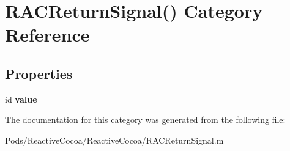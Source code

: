\hypertarget{category_r_a_c_return_signal_07_08}{}\section{R\+A\+C\+Return\+Signal() Category Reference}
\label{category_r_a_c_return_signal_07_08}
\subsection*{Properties}
\begin{DoxyCompactItemize}
\item 
\mbox{\label{category_r_a_c_return_signal_07_08_aa808511a21ebe3060fbdf40b58b436ac}} 
id {\bfseries value}
\end{DoxyCompactItemize}


The documentation for this category was generated from the following file\+:\begin{DoxyCompactItemize}
\item 
Pods/\+Reactive\+Cocoa/\+Reactive\+Cocoa/R\+A\+C\+Return\+Signal.\+m\end{DoxyCompactItemize}
